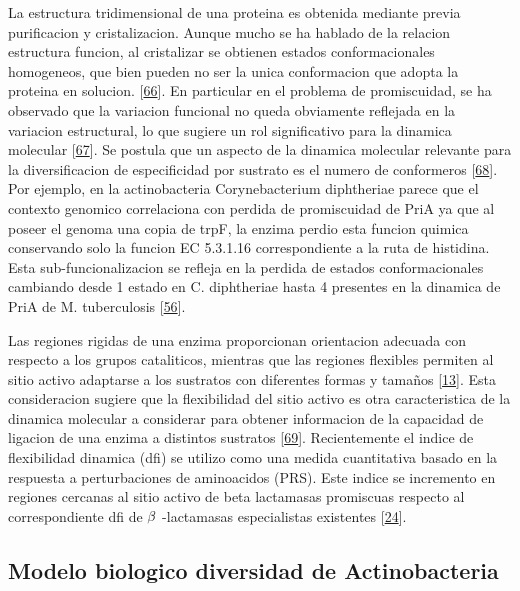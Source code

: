 \documentclass[12pt,twoside]{reedthesis}
\begin{document}
  La estructura tridimensional de una proteina es obtenida mediante previa
  purificacion y cristalizacion. Aunque mucho se ha hablado de la relacion
  estructura funcion, al cristalizar se obtienen estados conformacionales
  homogeneos, que bien pueden no ser la unica conformacion que adopta la
  proteina en solucion.
  {[}\protect\hyperlink{ref-james_conformational_2003}{66}{]}. En
  particular en el problema de promiscuidad, se ha observado que la
  variacion funcional no queda obviamente reflejada en la variacion
  estructural, lo que sugiere un rol significativo para la dinamica
  molecular {[}\protect\hyperlink{ref-parisi_conformational_2015}{67}{]}.
  Se postula que un aspecto de la dinamica molecular relevante para la
  diversificacion de especificidad por sustrato es el numero de
  conformeros {[}\protect\hyperlink{ref-javier_zea_protein_2013}{68}{]}.
  Por ejemplo, en la actinobacteria Corynebacterium diphtheriae parece que
  el contexto genomico correlaciona con perdida de promiscuidad de PriA ya
  que al poseer el genoma una copia de trpF, la enzima perdio esta funcion
  quimica conservando solo la funcion EC 5.3.1.16 correspondiente a la
  ruta de histidina. Esta sub-funcionalizacion se refleja en la perdida de
  estados conformacionales cambiando desde 1 estado en C. diphtheriae
  hasta 4 presentes en la dinamica de PriA de M. tuberculosis
  {[}\protect\hyperlink{ref-noda-garcia_evolution_2013}{56}{]}.
  
  Las regiones rigidas de una enzima proporcionan orientacion adecuada con
  respecto a los grupos cataliticos, mientras que las regiones flexibles
  permiten al sitio activo adaptarse a los sustratos con diferentes formas
  y tamaños {[}\protect\hyperlink{ref-copley_enzymes_2003}{13}{]}. Esta
  consideracion sugiere que la flexibilidad del sitio activo es otra
  caracteristica de la dinamica molecular a considerar para obtener
  informacion de la capacidad de ligacion de una enzima a distintos
  sustratos
  {[}\protect\hyperlink{ref-gatti-lafranconi_flexibility_2013}{69}{]}.
  Recientemente el indice de flexibilidad dinamica (dfi) se utilizo como
  una medida cuantitativa basado en la respuesta a perturbaciones de
  aminoacidos (PRS). Este indice se incremento en regiones cercanas al
  sitio activo de beta lactamasas promiscuas respecto al correspondiente
  dfi de \(\noindent\beta\) -lactamasas especialistas existentes
  {[}\protect\hyperlink{ref-zou_evolution_2015}{24}{]}.
  
  \subsection{Modelo biologico diversidad de
  Actinobacteria}\label{modelo-biologico-diversidad-de-actinobacteria}
  
\end{document}

